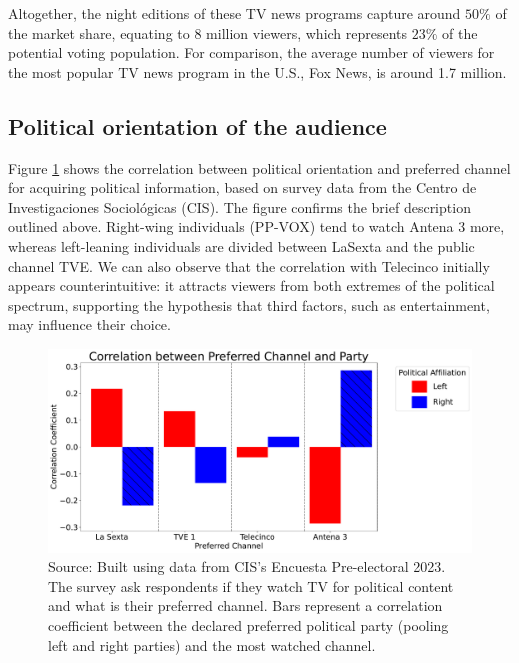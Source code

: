\documentclass[12pt]{article}
\begin{document}
	Altogether, the night editions of these TV news programs capture around $50\%$ of the market share, equating to 8 million viewers, which represents $23\%$ of the potential voting population. For comparison, the average number of viewers for the most popular TV news program in the U.S., Fox News, is around 1.7 million.
	
	
	
	
	
	
	
	\subsection{Political orientation of the audience }
	
	
	Figure \ref{opinion} shows the correlation between political orientation and preferred channel for acquiring political information, based on survey data from the Centro de Investigaciones Sociológicas (CIS). The figure confirms the brief description outlined above. Right-wing individuals (PP-VOX) tend to watch Antena 3 more, whereas left-leaning individuals are divided between LaSexta and the public channel TVE. We can also observe that the correlation with Telecinco initially appears counterintuitive: it attracts viewers from both extremes of the political spectrum, supporting the hypothesis that third factors, such as entertainment, may influence their choice.
	
	\begin{figure}[h!]
		\centering
		\includegraphics[width=160mm]{figures/corr_party_channel3}
		\caption{Source: Built using data from CIS's Encuesta Pre-electoral 2023. The survey ask respondents if they watch TV for political content and what is their preferred channel. Bars represent a correlation coefficient between the declared preferred political party (pooling left and right parties) and the most watched channel. }
		\label{opinion}
	\end{figure}
	
\end{document}
